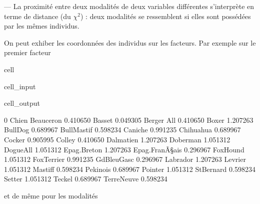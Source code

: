 \documentclass[letterpaper,10pt,french]{sphinxmanual}
\begin{document}
\sphinxAtStartPar
— La proximité entre deux modalités de deux variables différentes s’interprète en terme de distance (du \(\chi^2\)) : deux modalités se ressemblent si elles sont possédées par les mêmes individus.

\sphinxAtStartPar
On peut exhiber les coordonnées des individus sur les facteurs. Par exemple sur le premier facteur

\begin{sphinxuseclass}{cell}
\begin{sphinxuseclass}{cell_input}
\begin{sphinxVerbatim}[commandchars=\\\{\}]
\PYG{p}{[}\PYG{p}{]}
\end{sphinxVerbatim}

\end{sphinxuseclass}
\begin{sphinxuseclass}{cell_output}
\begin{sphinxVerbatim}[commandchars=\\\{\}]
                        0
Chien                    
Beauceron       \PYGZhy{}0.410650
Basset           0.049305
Berger All      \PYGZhy{}0.410650
Boxer            1.207263
Bull\PYGZhy{}Dog         0.689967
Bull\PYGZhy{}Mastif     \PYGZhy{}0.598234
Caniche          0.991235
Chihuahua        0.689967
Cocker           0.905995
Colley          \PYGZhy{}0.410650
Dalmatien        1.207263
Doberman        \PYGZhy{}1.051312
Dogue\PYGZhy{}All       \PYGZhy{}1.051312
Epag.\PYGZhy{}Breton     1.207263
Epag.\PYGZhy{}FranÃ\S{}ais \PYGZhy{}0.296967
Fox\PYGZhy{}Hound       \PYGZhy{}1.051312
Fox\PYGZhy{}Terrier      0.991235
Gd\PYGZhy{}Bleu\PYGZhy{}Gasc    \PYGZhy{}0.296967
Labrador         1.207263
Levrier         \PYGZhy{}1.051312
Mastiff         \PYGZhy{}0.598234
Pekinois         0.689967
Pointer         \PYGZhy{}1.051312
St\PYGZhy{}Bernard      \PYGZhy{}0.598234
Setter          \PYGZhy{}1.051312
Teckel           0.689967
Terre\PYGZhy{}Neuve     \PYGZhy{}0.598234
\end{sphinxVerbatim}

\end{sphinxuseclass}
\end{sphinxuseclass}
\sphinxAtStartPar
et de même pour les modalités
\end{document}
